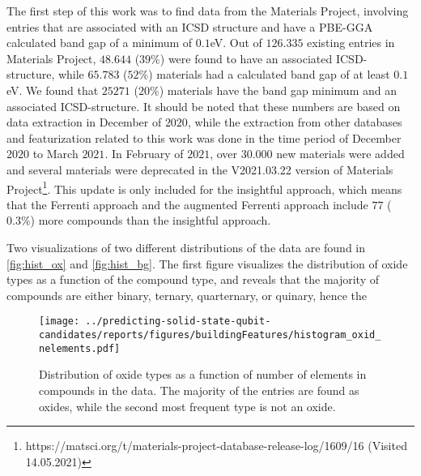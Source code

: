 The first step of this work was to find data from the Materials Project, involving entries that are associated with an ICSD structure and have a PBE-GGA calculated band gap of a minimum of $0.1$eV. Out of $126.335$ existing entries in Materials Project, $48.644$ ($39\%$) were found to have an associated ICSD-structure, while $65.783$ ($52\%$) materials had a calculated band gap of at least $0.1$eV. We found that $25271$ ($20\%$) materials have the band gap minimum and an associated ICSD-structure. It should be noted that these numbers are based on data extraction in December of $2020$, while the extraction from other databases and featurization related to this work was done in the time period of December $2020$ to March $2021$. In February of $2021$, over $30.000$ new materials were added and several materials were deprecated in the V2021.03.22 version of Materials Project\footnote{https://matsci.org/t/materials-project-database-release-log/1609/16 (Visited 14.05.2021)}. This update is only included for the insightful approach, which means that the Ferrenti approach and the augmented Ferrenti approach include $77$ ($0.3\%$) more compounds than the insightful approach.



Two visualizations of two different distributions of the data are found in \autoref{fig:hist_ox} and \autoref{fig:hist_bg}.
The first figure visualizes the distribution of oxide types as a function of the compound type, and reveals that the majority of compounds are either binary, ternary, quarternary, or quinary, hence the

\begin{figure}[]
      \centering
      \texttt{[image: ../predicting-solid-state-qubit-candidates/reports/figures/buildingFeatures/histogram\_oxid\_nelements.pdf]}
      \vspace*{-130mm}
      \caption{Distribution of oxide types as a function of number of elements in compounds in the data. The majority of the entries are found as oxides, while the second most frequent type is not an oxide. }
      \label{fig:hist_ox}
\end{figure}

